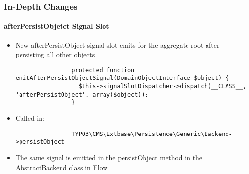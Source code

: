 \begin{frame}[fragile]
	\frametitle{In-Depth Changes}
	\framesubtitle{afterPersistObjetct Signal Slot}

	\lstset{
		basicstyle=\tiny\ttfamily
	}

	\begin{itemize}

		\item New afterPersistObject signal slot emits for the aggregate root after persisting all other objects

			\begin{lstlisting}
				protected function emitAfterPersistObjectSignal(DomainObjectInterface $object) {
				  $this->signalSlotDispatcher->dispatch(__CLASS__, 'afterPersistObject', array($object));
				}
			\end{lstlisting}

		\item Called in:

			\begin{lstlisting}
				TYPO3\CMS\Extbase\Persistence\Generic\Backend->persistObject
			\end{lstlisting}

		\item The same signal is emitted in the persistObject method in the AbstractBackend class in Flow

	\end{itemize}

\end{frame}



